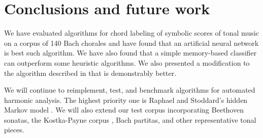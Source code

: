 \documentclass{article}
\begin{document}
\section{Conclusions and future work}
\label{sec:conclusions}

We have evaluated algorithms for chord labeling of symbolic scores of
tonal music on a corpus of 140 Bach chorales and have found that an
artificial neural network is best such algorithm. We have also found
that a simple memory-based classifier can outperform some heuristic
algorithms. We also presented a modification to the algorithm
described in \cite{pardo.ea:algorithms} that is demonstrably better.

We will continue to reimplement, test, and benchmark algorithms for
automated harmonic analysis. The highest priority one is Raphael and
Stoddard's hidden Markov model \cite{raphael.ea:harmonic}. We will
also extend our test corpus incorporating Beethoven sonatas, the
Kostka-Payne corpus \cite{temperley:bayesian}, Bach partitas, and
other representative tonal pieces.



\end{document}
